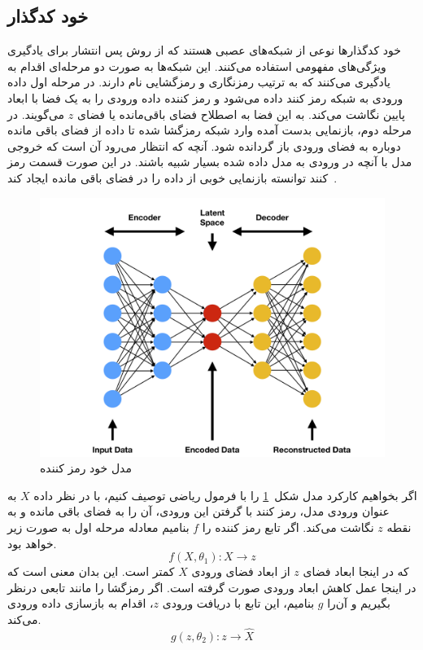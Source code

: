 \documentclass[12pt,a4paper]{report}
\theoremstyle{definition}
\theoremstyle{definition}
\begin{document}
	\subsection{خود کدگذار}
	خود کدگذار‌ها نوعی از شبکه‌های عصبی هستند که از روش پس انتشار برای یادگیری ویژگی‌های مفهومی استفاده می‌کنند. این شبکه‌ها به صورت دو مرحله‌ای اقدام به یادگیری می‌کنند که به ترتیب رمزنگاری و رمزگشایی نام دارند. در مرحله اول داده ورودی به شبکه رمز کنند داده می‌شود و رمز کننده داده ورودی را به یک فضا با ابعاد پایین نگاشت می‌کند. به این فضا به اصطلاح فضای باقی‌مانده یا فضای $z$ می‌گویند. در مرحله دوم، بازنمایی بدست آمده وارد شبکه رمزگشا شده تا داده از فضای باقی مانده دوباره به فضای ورودی باز گردانده شود. آنچه که انتظار می‌رود آن است که خروجی مدل با آنچه در ورودی به مدل داده شده بسیار شبیه باشند. در این صورت قسمت رمز کنند توانسته بازنمایی خوبی از داده را در فضای باقی مانده ایجاد کند~\cite{BHUVANESHWARI2021131}.
\begin{figure}[!h]
	\begin{center}
		\includegraphics[width=0.6\linewidth]{./images/figures/ae.png}
	\end{center}
	\caption{مدل خود رمز کننده}
	\label{fig:ae}
	\centering
\end{figure}

اگر بخواهیم کارکرد مدل شکل~\ref{fig:ae} را با فرمول ریاضی توصیف کنیم، با در نظر داده $X$ به عنوان ورودی مدل، رمز کنند با گرفتن این ورودی، آن را به فضای باقی مانده و به نقطه $z$ نگاشت می‌کند. اگر تابع رمز کننده را $f$ بنامیم معادله مرحله اول به صورت زیر خواهد بود.
\begin{equation}
f(X, \theta_1): X \rightarrow z
\end{equation}
که در اینجا ابعاد فضای $z$ از ابعاد فضای ورودی $X$ کمتر است. این بدان معنی است که در اینجا عمل کاهش ابعاد ورودی صورت گرفته است. اگر رمزگشا را مانند تابعی درنظر بگیریم و آن‌را $g$ بنامیم، این تابع با دریافت ورودی $z$، اقدام به بازسازی داده ورودی می‌کند.
\begin{equation}
	g(z, \theta_2): z \rightarrow \hat{X}
\end{equation}
\end{document}
